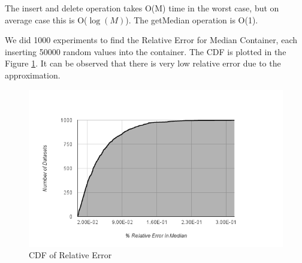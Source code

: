 The insert and delete operation takes O(M) time in the worst case, but on average case this is O($\log(M)$). The getMedian operation is O(1).

We did 1000 experiments to find the Relative Error for Median Container, each inserting 50000 random values into the container.
The CDF is plotted in the Figure \ref{fig:relative_error}.
It can be observed that there is very low relative error due to the approximation.


\begin{figure}[h]
\begin{center}
\includegraphics[scale=0.5]{img/relative_error}
\caption{CDF of Relative Error \label{fig:relative_error}}
\end{center}
\end{figure}

